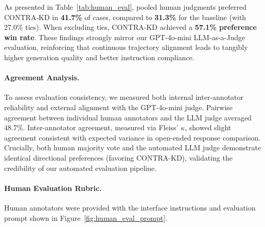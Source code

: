 \documentclass{article} %
\theoremstyle{definition}
\theoremstyle{remark}
\begin{document}
As presented in Table~\ref{tab:human_eval}, pooled human judgments preferred CONTRA-KD in \textbf{41.7\%} of cases, compared to \textbf{31.3\%} for the baseline (with 27.0\% ties). When excluding ties, CONTRA-KD achieved a \textbf{57.1\% preference win rate}. These findings strongly mirror our GPT-4o-mini LLM-as-a-Judge evaluation, reinforcing that continuous trajectory alignment leads to tangibly higher generation quality and better instruction compliance.

\paragraph{Agreement Analysis.} To assess evaluation consistency, we measured both internal inter-annotator reliability and external alignment with the GPT-4o-mini judge. Pairwise agreement between individual human annotators and the LLM judge averaged 48.7\%. Inter-annotator agreement, measured via Fleiss' $\kappa$, showed slight agreement consistent with expected variance in open-ended response comparison. Crucially, both human majority vote and the automated LLM judge demonstrate identical directional preferences (favoring CONTRA-KD), validating the credibility of our automated evaluation pipeline.

\paragraph{Human Evaluation Rubric.} Human annotators were provided with the interface instructions and evaluation prompt shown in Figure~\ref{fig:human_eval_prompt}.
\end{document}
